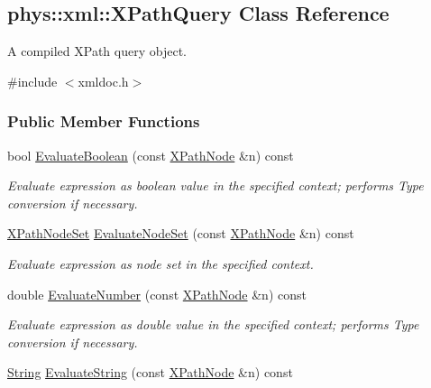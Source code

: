\hypertarget{classphys_1_1xml_1_1XPathQuery}{
\subsection{phys::xml::XPathQuery Class Reference}
\label{classphys_1_1xml_1_1XPathQuery}
}


A compiled XPath query object.  




{\ttfamily \#include $<$xmldoc.h$>$}

\subsubsection*{Public Member Functions}
\begin{DoxyCompactItemize}
\item 
bool \hyperlink{classphys_1_1xml_1_1XPathQuery_a44fed594a458aa4b6cf4f3d12d5089a8}{EvaluateBoolean} (const \hyperlink{classphys_1_1xml_1_1XPathNode}{XPathNode} \&n) const 
\begin{DoxyCompactList}\small\item\em Evaluate expression as boolean value in the specified context; performs Type conversion if necessary. \item\end{DoxyCompactList}\item 
\hyperlink{classphys_1_1xml_1_1XPathNodeSet}{XPathNodeSet} \hyperlink{classphys_1_1xml_1_1XPathQuery_af00ba3d0346ccc01f249274947191333}{EvaluateNodeSet} (const \hyperlink{classphys_1_1xml_1_1XPathNode}{XPathNode} \&n) const 
\begin{DoxyCompactList}\small\item\em Evaluate expression as node set in the specified context. \item\end{DoxyCompactList}\item 
double \hyperlink{classphys_1_1xml_1_1XPathQuery_aacfcff30901ce20b92de56ec0e2d70e5}{EvaluateNumber} (const \hyperlink{classphys_1_1xml_1_1XPathNode}{XPathNode} \&n) const 
\begin{DoxyCompactList}\small\item\em Evaluate expression as double value in the specified context; performs Type conversion if necessary. \item\end{DoxyCompactList}\item 
\hyperlink{namespacephys_1_1xml_a4d8ca7638328d16d303e5a4c849f4704}{String} \hyperlink{classphys_1_1xml_1_1XPathQuery_ab7084be2e608b38872167fe3321554b9}{EvaluateString} (const \hyperlink{classphys_1_1xml_1_1XPathNode}{XPathNode} \&n) const 

\end{DoxyCompactItemize}
